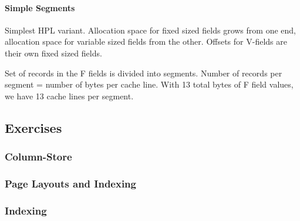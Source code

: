 \paragraph{Simple Segments}
Simplest HPL variant. Allocation space for fixed sized fields grows from one end, allocation space for variable sized fields from the other. Offsets for V-fields are their own fixed sized fields.


Set of records in the F fields is divided into segments. Number of records per segment = number of bytes per cache line. With 13 total bytes of F field values, we have 13 cache lines per segment.







\subsection{Exercises}

\subsubsection{Column-Store}

\subsubsection{Page Layouts and Indexing}

\subsubsection{Indexing}
